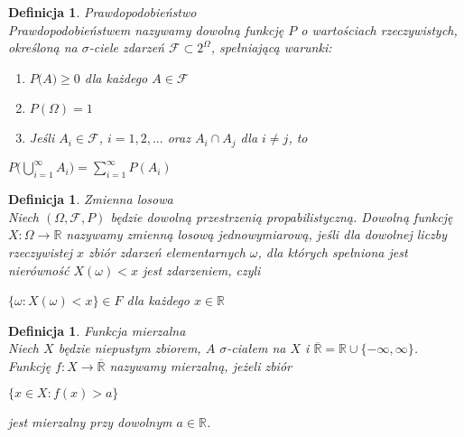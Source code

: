 \documentclass[12pt,a4paper]{report}
\newtheorem{definition}[theorem]{Definicja}
\begin{document}
\begin{definition}{Prawdopodobieństwo \cite[w oparciu o rozdział 1.1]{krysicki1999}\\}
Prawdopodobieństwem nazywamy dowolną funkcję $P$ o wartościach rzeczywistych, określoną na $\sigma$-ciele zdarzeń $\mathcal{F} \subset 2^\Omega$, spełniającą warunki: \\
\begin{enumerate}
\item $\textit{P(A)} \geq 0$ dla każdego $\textit{A} \in \mathcal{F}$
\item $\textit{P}(\Omega) = 1$
\item Jeśli $\textit{A}_{i} \in \mathcal{F}$, $i= 1, 2, ...$ oraz $A_{i} \cap A_{j}$ dla $i \neq j$, to 
\end{enumerate}
\begin{center}
$P \Big(\bigcup\limits_{i=1}^{\infty} A_{i} \Big)=\sum_{i=1}^{\infty} P(A_{i}) $\\
\end{center}
\end{definition}

\begin{definition}{Zmienna losowa \cite[Rozdział 2.1]{krysicki1999}\\}
Niech $(\Omega, \mathcal{F}, P)$ będzie dowolną przestrzenią propabilistyczną. Dowolną funkcję $\textit{X} : \Omega \rightarrow \mathbb{R}$ nazywamy zmienną losową jednowymiarową, jeśli dla dowolnej liczby rzeczywistej $x$ zbiór zdarzeń elementarnych $\omega$, dla których spełniona jest nierówność $X(\omega)< x$ jest zdarzeniem, czyli 
\begin{center}
$\{\omega: X(\omega) < x \} \in \textit{F}$ dla każdego $x \in \mathbb{R}$\\
\end{center}
\end{definition}


\begin{definition}{Funkcja mierzalna \cite[w oparciu o rozdział 8.2]{rudnicki2006}\\}
Niech $X$ będzie niepustym zbiorem, $A$  $\sigma$-ciałem na $X$ i $\overline{\mathbb{R}} = \mathbb{R} \cup \{-\infty, \infty \}$. Funkcję $f: X \rightarrow \overline{\mathbb{R}}$ nazywamy mierzalną, jeżeli zbiór
\begin{center}
$\{ x \in X: f(x) > a \}$
\end{center}
jest mierzalny przy dowolnym $a \in \mathbb{R}$.\\
\end{definition}
\end{document}
